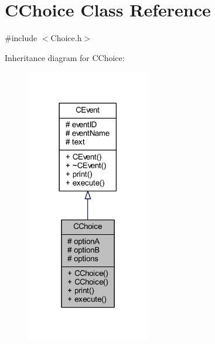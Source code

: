 \hypertarget{class_c_choice}{}\section{C\+Choice Class Reference}
\label{class_c_choice}


{\ttfamily \#include $<$Choice.\+h$>$}



Inheritance diagram for C\+Choice\+:\nopagebreak
\begin{figure}[H]
\begin{center}
\leavevmode
\includegraphics[width=153pt]{class_c_choice__inherit__graph}
\end{center}
\end{figure}


